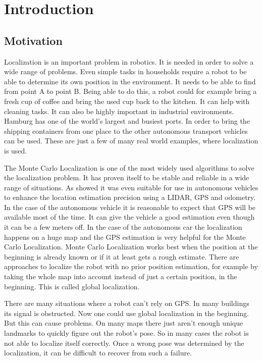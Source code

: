 \chapter{Introduction} %
\label{Chapter1}

\section{Motivation}
Localization is an important problem in robotics. It is needed in order to solve a wide range of problems. Even simple tasks in households require a robot to be able to determine its own position in the environment. It needs to be able to find from point A to point B. Being able to do this, a robot could for example bring a fresh cup of coffee and bring the used cup back to the kitchen. It can help with cleaning tasks.\cite{pinheiro2015cleaning} It can also be highly important in industrial environments. Hamburg has one of the world's largest and busiest ports. In order to bring the shipping containers from one place to the other autonomous transport vehicles can be used. These are just a few of many real world examples, where localization is used.

The Monte Carlo Localization\cite{Dellaert_1999_533} is one of the most widely used algorithms to solve the localization problem. It has proven itself to be stable and reliable in a wide range of situations. As \cite{DBLP:conf/rss/LevinsonMT07} showed it was even suitable for use in autonomous vehicles to enhance the location estimation precision using a LIDAR, GPS and odometry.
In the case of the autonomous vehicle it is reasonable to expect that GPS will be available most of the time. It can give the vehicle a good estimation even though it can be a few meters off. In the case of the autonomous car the localization happens on a huge map and the GPS estimation is very helpful for the Monte Carlo Localization. Monte Carlo Localization works best when the position at the beginning is already known or if it at least gets a rough estimate. There are approaches to localize the robot with no prior position estimation, for example by taking the whole map into account instead of just a certain position, in the beginning. This is called global localization.

There are many situations where a robot can't rely on GPS. In many buildings its signal is obstructed. Now one could use global localization in the beginning.
But this can cause problems. On many maps there just aren't enough unique landmarks to quickly figure out the robot's pose. So in many cases the robot is not able to localize itself correctly. Once a wrong pose was determined by the localization, it can be difficult to recover from such a failure.

